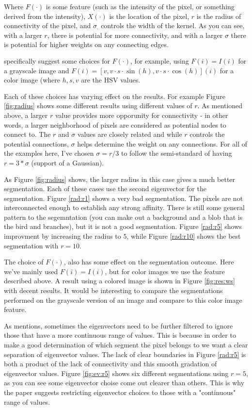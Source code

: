 \documentclass[11pt]{article}
\begin{document}
Where $F(\cdot)$ is some feature (such as the intensity of the pixel, or something derived from the intensity), $X(\cdot)$ is the location of the pixel, $r$ is the radius of connectivity of the pixel, and $\sigma_{\cdot}$ controls the width of the kernel.
As you can see, with a larger $r$, there is potential for more connectivity, and with a larger $\sigma$ there is potential for higher weights on any connecting edges.

\cite{Shi2000} specifically suggest some choices for $F(\cdot)$, for example, using $F(i)=I(i)$ for a grayscale image and $F(i) = [v,v \cdot s \cdot \sin(h), v \cdot s \cdot \cos(h)](i)$ for a color image (where $h,s,v$ are the HSV values.

Each of these choices has varying effect on the results.
For example Figure \ref{fig:radius} shows some different results using different values of $r$.
As mentioned above, a larger $r$ value provides more opporunity for connectivity - in other words, a larger neighborhood of pixels are considered as potential nodes to connect to.
The $r$ and $\sigma$ values are closely related and while $r$ controls the potential connections, $\sigma$ helps determine the weight on any connections.
For all of the examples here, I've chosen $\sigma = r/3$ to follow the semi-standard of having $r = 3*\sigma$ (support of a Gaussian).

As Figure \ref{fig:radius} shows, the larger radius in this case gives a much better segmentation.
Each of these cases use the second eigenvector for the segmentation.
Figure \ref{rad:r1} shows a very bad segmentation.
The pixels are not interconnected enough to establish any strong affinity.
There is still some general pattern to the segemntation (you can make out a background and a blob that is the bird and branches), but it is not a good segmentation.
Figure \ref{rad:r5} shows improvment by increasing the radius to $5$, while Figure \ref{rad:r10} shows the best segmentation with $r=10$.

The choice of $F(\cdot)$, also has some effect on the segmentation outcome.
Here we've mainly used $F(i)=I(i)$, but for color images we use the feature described above.
A result using a colored image is shown in Figure \ref{fig:res:ws} with decent results.
It would be interesting to compare the segmentations performed on the grayscale version of an image and compare to this color image feature.

As \cite{Shi2000} mentions, sometimes the eigenvectors need to be further filtered to ignore those that have a more continuous range of values.
This is because in order to make a good determination of which segment the pixel belongs to we want a clear separation of eigenvector values.
The lack of clear boundaries in Figure \ref{rad:r5} is both a product of the lack of connectivity and this smooth gradation of eigenvector values.
Figure \ref{fig:ev:r5} shows six different segmentations using $r=5$, as you can see some eigenvector choise come out clearer than others.
This is why the paper suggests restricting eigenvector choices to those with a "continuous" range of values.
\end{document}
